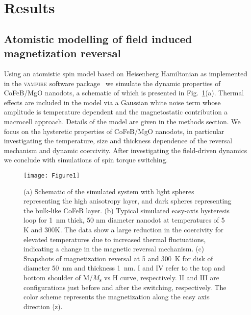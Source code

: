 \documentclass[aps,prb,signlecolumn,preprint,superscriptaddress,10]{revtex4-1}
\newcommand{\vampire}{\textsc{vampire}\xspace}
\newcommand{\Mags}{\ensuremath{M_{\mathrm{s}}}\xspace}
\begin{document}
\section*{Results}
\subsection*{Atomistic modelling of field induced magnetization reversal}
Using an atomistic spin model based on Heisenberg Hamiltonian as implemented in the \vampire software package~\cite{vampire,vampire-rev} we simulate the dynamic properties of CoFeB/MgO nanodots, a schematic of which is presented in Fig.~\ref{fig:dots}(a). Thermal effects  are included in the model via a Gaussian white noise term whose amplitude is temperature dependent and the magnetostatic contribution a macrocell approach. Details of the model are given in the methods section. We focus on the hysteretic properties of CoFeB/MgO nanodots, in particular investigating the temperature, size and thickness dependence of the reversal mechanism and dynamic coercivity. After investigating the field-driven dynamics we conclude with simulations of spin torque switching.
%
\begin{figure}[!tb]
    \centering
		\texttt{[image: Figure1]}
			\caption{(a) Schematic of the simulated system with light spheres representing the high anisotropy layer, and dark spheres representing the bulk-like CoFeB layer. (b) Typical simulated easy-axis hysteresis loop for 1~nm thick, 50 nm diameter nanodot at temperatures of 5 K and 300K. The data show a large reduction in the coercivity for elevated temperatures due to increased thermal fluctuations, indicating a change in  the magnetic reversal mechanism. (c) Snapshots of magnetization reversal at 5 and 300~K for disk of diameter 50~nm and thickness 1~nm. I and IV refer to the top and bottom shoulder of M/\Mags vs  H curve, respectively. II and III are configurations just before and after the switching, respectively. The color scheme represents the magnetization along the easy axis direction (z).}
		\label{fig:dots}
\end{figure}
% 
\end{document}
